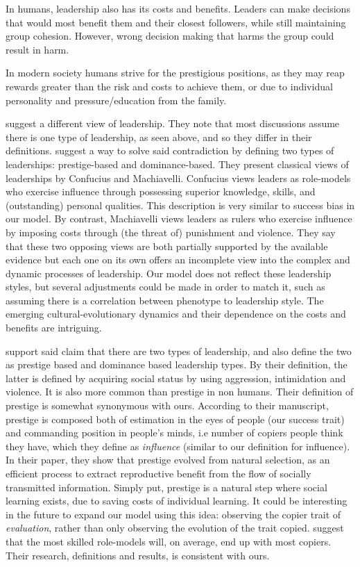 \documentclass[12pt]{extarticle}
\begin{document}
In humans, leadership also has its costs and benefits. Leaders can make decisions that would most benefit them and their closest followers, while still maintaining group cohesion. However, wrong decision making that harms the group could result in harm.

In modern society humans strive for the prestigious positions, as they may reap rewards greater than the risk and costs to achieve them, or due to individual personality and pressure/education from the family.

\citet{dual_leadership} suggest a different view of leadership. They note that most discussions assume there is one type of leadership, as seen above, and so they differ in their definitions. \citet{dual_leadership} suggest a way to solve said contradiction by defining two types of leaderships: prestige-based and dominance-based.
They present classical views of leaderships by Confucius and Machiavelli. Confucius views leaders as role-models who exercise influence through possessing superior knowledge, skills,
and (outstanding) personal qualities. This description is very similar to success bias in our model. 
By contrast, Machiavelli views leaders as rulers who exercise influence by imposing costs through (the threat of) punishment and violence.
They say that these two opposing views are both partially supported by the available evidence but each one on its own offers an incomplete view into the complex and dynamic processes of leadership. 
Our model does not reflect these leadership styles, but several adjustments could be made in order to match it, such as assuming there is a correlation between phenotype to leadership style. 
The emerging cultural-evolutionary dynamics and their dependence on the costs and benefits are intriguing.

\citet{prestige_evolution} support said claim that there are two types of leadership, and also define the two as prestige based and dominance based leadership types.
By their definition, the latter is defined by acquiring social status by using aggression, intimidation and violence. It is also more common than prestige in non humans. Their definition of prestige is somewhat synonymous with ours. According to their manuscript, prestige is composed both of estimation in the eyes of people (our success trait) and commanding position in people's minds, i.e number of copiers people think they have, which they define as \textit{influence} (similar to our definition for influence).
In their paper, they show that prestige evolved from natural selection, as an efficient process to extract reproductive benefit from the flow of socially transmitted information. Simply put, prestige is a natural step where social learning exists, due to saving costs of individual learning.
It could be interesting in the future to expand our model using this idea: observing the copier trait of \textit{evaluation}, rather than only observing the evolution of the trait copied.
\citet{prestige_evolution} suggest that the most skilled role-models will, on average, end up with most copiers. Their research, definitions and results, is consistent with ours.
\end{document}
